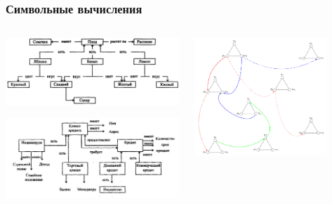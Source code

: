 \documentclass[default]{beamer}
\begin{document}
\begin{frame}
\begin{columns}
\begin{column}{0.3\textwidth}
			\end{column}			
		\end{columns}
	\end{frame}
	
	\begin{frame}
		\frametitle{Символьные вычисления}
		
		\begin{columns}
			\begin{column}{0.5\textwidth}
				\centering
				\includegraphics[width=\textwidth]{advert/semnet1}
				\par\bigskip
				\hspace{-7mm}\includegraphics[width=\textwidth]{advert/semnet2}
			\end{column}
			\begin{column}{0.5\textwidth}
				\centering
				\includegraphics[width=0.8\textwidth]{signs/signs_net}

\end{column}
\end{columns}
\end{frame}
\end{document}
